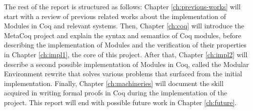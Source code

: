 The rest of the report is structured as follows: Chapter \ref{ch:previous-works}
will start with a review of previous related works about the implementation of
Modules in Coq and relevant systems. Then, Chapter \ref{ch:coq} will introduce
the MetaCoq project and explain the syntax and semantics of Coq modules, before
describing the implementation of Modules and the verification of their
properties in Chapter \ref{ch:impl1}, the core of this project. After that,
Chapter \ref{ch:impl2} will describe a second possible implementation of Modules
in Coq, called the Modular Environment rewrite that solves various problems that
surfaced from the initial implementation. Finally, Chapter \ref{ch:machineries}
will document the skill acquired in writing formal proofs in Coq during the
implementation of the project. This report will end with possible future work in
Chapter \ref{ch:future}.
